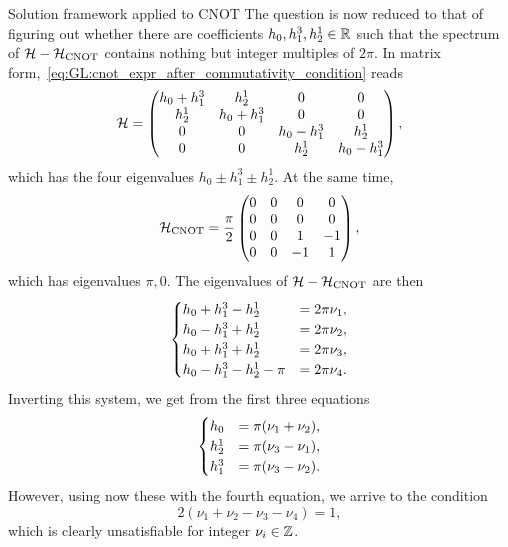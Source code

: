 \begin{examplebox}[label={ex:GL:cnot_with_conditions}]{Solution framework applied to CNOT}
The question is now reduced to that of figuring out whether there are coefficients $h_0,h_1^3,h_2^1\in\mathbb{R}$ such that the spectrum of ${\mathcal{H}}-{\mathcal{H}}_{\operatorname{CNOT}}$ contains nothing but integer multiples of $2\pi$.
In matrix form,~\cref{eq:GL:cnot_expr_after_commutativity_condition} reads
\begin{equation}
    {\mathcal{H}} = \begin{pmatrix}
        h_0 + h_1^3 & h_2^1 & 0 & 0 \\
        h_2^1 & h_0 + h_1^3 & 0 & 0 \\
        0 & 0 & h_0 - h_1^3 & h_2^1 \\
        0 & 0 & h_2^1 & h_0 - h_1^3
    \end{pmatrix},
\end{equation}
which has the four eigenvalues $h_0\pm h_1^3 \pm h_2^1$.
At the same time,
\begin{equation}
    {\mathcal{H}}_{\operatorname{CNOT}} = \frac{\pi}{2}\begin{pmatrix}
        0 & 0 & 0 & 0 \\
        0 & 0 & 0 & 0 \\
        0 & 0 & 1 & -1 \\
        0 & 0 & -1 & 1
    \end{pmatrix},
\end{equation}
which has eigenvalues $\pi,0$. The eigenvalues of ${\mathcal{H}}-{\mathcal{H}}_{\operatorname{CNOT}}$ are then
\begin{equation}
\def\id{h_0}
\def\Z1{h_1^3}
\def\X2{h_2^1}
\begin{cases}
    \id + \Z1 - \X2 &= 2\pi \nu_1, \\
    \id - \Z1 + \X2 &= 2\pi \nu_2, \\
    \id + \Z1 + \X2 &= 2\pi \nu_3, \\
    \id - \Z1 - \X2 - \pi &= 2\pi \nu_4.
\end{cases}
\end{equation}
Inverting this system, we get from the first three equations
\begin{equation}
\def\id{h_0}
\def\Z1{h_1^3}
\def\X2{h_2^1}
\begin{cases}
    \id &= \pi (\nu_1 + \nu_2), \\
    \X2 &= \pi (\nu_3 - \nu_1), \\
    \Z1 &= \pi (\nu_3 - \nu_2).
\end{cases}
\end{equation}
However, using now these with the fourth equation, we arrive to the condition
\begin{equation}
    2(\nu_1 + \nu_2 - \nu_3 - \nu_4) = 1,
\end{equation}
which is clearly unsatisfiable for integer $\nu_i\in\mathbb{Z}$.


\end{examplebox}
